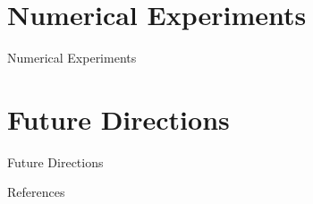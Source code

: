 \documentclass[11pt]{beamer}
\begin{document}
\section{Numerical Experiments}
\begin{frame}{Numerical Experiments}
    \end{frame}

\section{Future Directions}
\begin{frame}{Future Directions}

\end{frame}
    
    
    
\begin{frame}[allowframebreaks]{References}
  \printbibliography
\end{frame}
\end{document}
